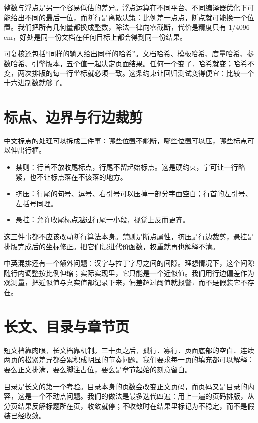 \documentclass{article}
\begin{document}
整数与浮点是另一个容易低估的差异。浮点运算在不同平台、不同编译器优化下可能给出不同的最后一位，而断行是离散决策：比例差一点点，断点就可能换一个位置。我们把所有几何量都换成整数，除法一律向零截断，代价是精度只有 1/4096 em，好处是同一份文档在任何目标上都会得到同一份结果。

可复核还包括“同样的输入给出同样的哈希”。文档哈希、模板哈希、度量哈希、参数哈希、引擎版本，五个值一起决定页面结果。任何一个变了，哈希就变；哈希不变，两次排版的每一行坐标就必须一致。这条约束让回归测试变得便宜：比较一个十六进制数就够了。

\section{标点、边界与行边裁剪}

中文标点的处理可以拆成三件事：哪些位置不能断，哪些位置可以压，哪些标点可以伸出行框。

\begin{itemize}
\item 禁则：行首不放收尾标点，行尾不留起始标点。这是硬约束，宁可让一行略紧，也不让标点落在不该落的地方。
\item 挤压：行尾的句号、逗号、右引号可以压掉一部分字面空白；行首的左引号、左括号同理。
\item 悬挂：允许收尾标点越过行尾一小段，视觉上反而更齐。
\end{itemize}

这三件事都不应该改动断行算法本身。禁则是断点属性，挤压是行边裁剪，悬挂是排版完成后的坐标修正。把它们混进代价函数，权重就再也解释不清。

中英混排还有一个额外问题：汉字与拉丁字母之间的间隙。理想情况下，这个间隙随行内调整按比例伸缩；实际实现里，它只能是一个近似值。我们用行边偏差作为观测量，把近似值与真实值都记录下来，偏差超过阈值就报警，而不是假装它不存在。

\section{长文、目录与章节页}

短文档靠肉眼，长文档靠机制。三十页之后，孤行、寡行、页面底部的空白、连续两页的松紧差异都会累积成明显的节奏问题。我们要求每一页的填充都可以解释：要么正文排满，要么脚注占位，要么是章节起始的刻意留白。

目录是长文的第一个考验。目录本身的页数会改变正文页码，而页码又是目录的内容，这是一个不动点问题。我们的做法是最多迭代四遍：用上一遍的页码排版，从分页结果反解标题所在页，收敛就停；不收敛时在结果里标记为不稳定，而不是假装已经收敛。
\end{document}
